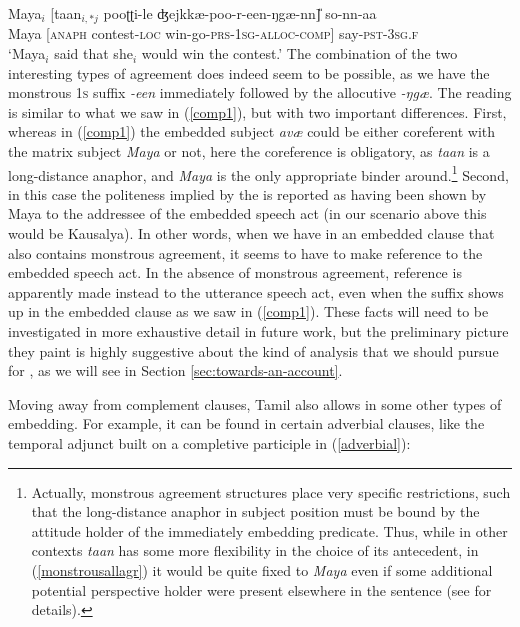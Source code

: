 \documentclass[output=paper, modfonts, nonflat]{langsci/langscibook}
\begin{document}
\ea\label{monstrousallagr}\gll Maya$_i$ [taan$_{i,*j}$ pooʈʈi-le ʤejkkæ-poo-r-een-ŋgæ-nn\U] so-nn-aa\\  
Maya [\textsc{anaph} contest-\textsc{loc}{} win-go-\textsc{prs}-1\textsc{sg}-\textsc{alloc}-\textsc{comp}] say-\textsc{pst}-3\textsc{sg.f}\\ 
\glt `Maya$_i$ said that she$_i$ would win the contest.'
\z
%
The combination of the two interesting types of agreement does indeed
seem to be possible, as we have the monstrous \textsc{1s} suffix
\textit{-een} immediately followed by the allocutive
\textit{-ŋgæ}. The reading is similar to what we saw in
(\ref{comp1}), but with two important differences. First, whereas in
(\ref{comp1}) the embedded subject \textit{avæ} could be either
coreferent with the matrix subject \textit{Maya} or not, here the
coreference is obligatory, as \textit{taan} is a long-distance
anaphor, and \textit{Maya} is the only appropriate binder
around.\footnote{Actually, monstrous agreement structures place very
  specific restrictions, such that the long-distance anaphor in
  subject position must be bound by the attitude holder of the
  immediately embedding predicate. Thus, while in other contexts
  \textit{taan} has some more flexibility in the choice of its
  antecedent, in (\ref{monstrousallagr}) it would be quite fixed to
  \textit{Maya} even if some additional potential perspective holder
  were present elsewhere in the sentence (see \citealt{sundaresan:diss} for details).} 
Second, in this case the politeness
implied by the \allagr{} is reported as having been shown by Maya to
the addressee of the embedded speech act (in our scenario above this
would be Kausalya). In other words, when we have \allagr{} in an
embedded clause that also contains monstrous agreement, it seems to
have to make reference to the embedded speech act. In the absence of
monstrous agreement, reference is apparently made instead to the
utterance speech act, even when the suffix shows up in the embedded
clause as we saw in (\ref{comp1}). These facts will need to be
investigated in more exhaustive detail in future work, but the
preliminary picture they paint is highly suggestive about the kind of
analysis that we should pursue for \allagr, as we will see in Section
\ref{sec:towards-an-account}.

Moving away from complement clauses, Tamil also allows \allagr{} in
some other types of embedding. For example, it can be found in certain
adverbial clauses, like the temporal adjunct built on a completive
participle in (\ref{adverbial}):
\end{document}
